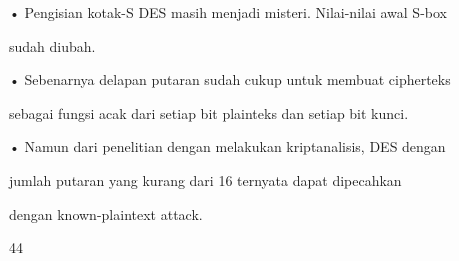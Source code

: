 \documentclass{article}
\begin{document}

• Pengisian kotak-S DES masih menjadi misteri. Nilai-nilai awal  S-box 

sudah diubah.

• Sebenarnya delapan putaran sudah cukup untuk membuat cipherteks 

sebagai fungsi acak dari setiap bit plainteks dan setiap bit kunci. 

• Namun dari penelitian dengan melakukan kriptanalisis, DES dengan 

jumlah putaran yang kurang dari 16 ternyata dapat dipecahkan 

dengan known-plaintext attack.

44
\end{document}
